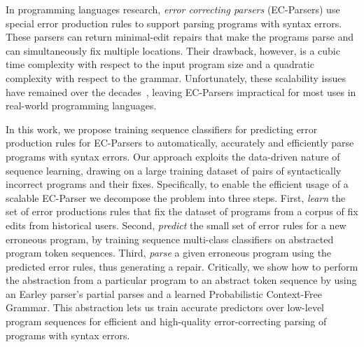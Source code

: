 In programming languages research, \emph{error
correcting parsers} (EC-Parsers) \citep{Aho_1972} use special error production
rules to support parsing programs with syntax errors. These parsers can return
minimal-edit repairs that make the programs parse and can simultaneously fix
multiple locations. Their drawback,
however, is a cubic time complexity with respect to the
input program size and a quadratic complexity with respect to the grammar.
%
Unfortunately, these scalability issues have remained over the
decades~\citep{McLean1996, Rajasekaran2014}, leaving EC-Parsers
impractical for most uses in real-world programming languages.

In this work, we propose training sequence classifiers for predicting
error
production rules for EC-Parsers to automatically, accurately and
efficiently parse programs with syntax errors. Our approach exploits the data-driven
nature of sequence learning, drawing on a large training dataset of pairs
of syntactically incorrect programs and their fixes.
%
Specifically, to enable the efficient usage of a scalable EC-Parser we decompose
the problem into three steps.
%
First, \emph{learn} the set of error productions rules that fix the dataset of
programs from a corpus of fix edits from historical users.
%
Second, \emph{predict} the small set of error rules for a new erroneous program,
by training sequence multi-class classifiers on abstracted program token
sequences.
%
Third, \emph{parse} a given erroneous program using the predicted error rules,
thus generating a repair.
%
Critically, we show how to perform the abstraction from a particular
program to an abstract token sequence by using an Earley parser's
\citep{Earley_1970} partial parses and a learned Probabilistic Context-Free
Grammar. This abstraction lets us train accurate predictors over low-level
program sequences for efficient and high-quality
error-correcting parsing of programs with syntax errors.

